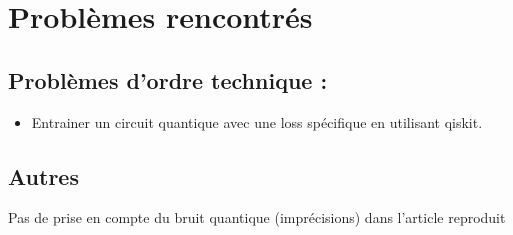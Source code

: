 \documentclass[11pt,a4paper]{article}
\begin{document}
\section{Problèmes rencontrés}

\subsection*{Problèmes d'ordre technique : }
\begin{itemize}
    \item Entrainer un circuit quantique avec une loss spécifique en utilisant qiskit.
\end{itemize}


\subsection*{Autres}
Pas de prise en compte du bruit quantique (imprécisions) dans l'article reproduit

\newpage
\printbibliography
\end{document}
